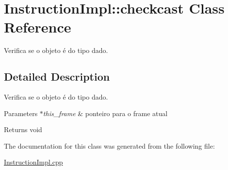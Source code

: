 \hypertarget{class_instruction_impl_1_1checkcast}{}\section{Instruction\+Impl\+:\+:checkcast Class Reference}
\label{class_instruction_impl_1_1checkcast}


Verifica se o objeto é do tipo dado.  




\subsection{Detailed Description}
Verifica se o objeto é do tipo dado. 


\begin{DoxyParams}{Parameters}
{\em $\ast$this\+\_\+frame} & ponteiro para o frame atual \\
\hline
\end{DoxyParams}
\begin{DoxyReturn}{Returns}
void 
\end{DoxyReturn}


The documentation for this class was generated from the following file\+:\begin{DoxyCompactItemize}
\item 
\hyperlink{_instruction_impl_8cpp}{Instruction\+Impl.\+cpp}\end{DoxyCompactItemize}
